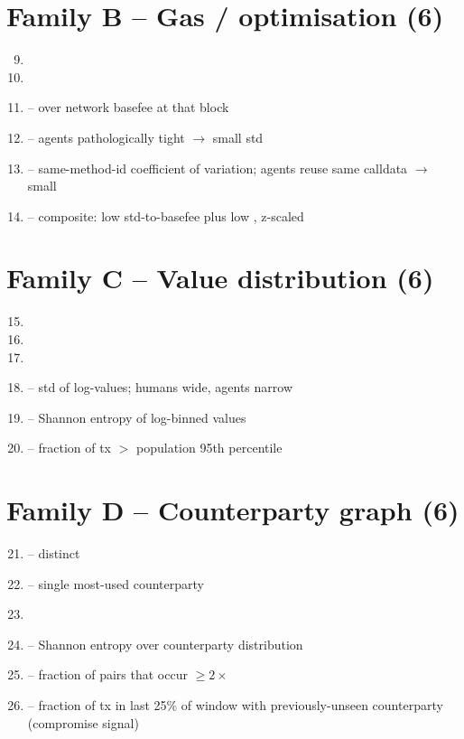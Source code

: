 \documentclass[11pt]{article}
\begin{document}
\section{Family B -- Gas / optimisation (6)}
\begin{enumerate}\setcounter{enumi}{8}
  \item {}
  \item {}
  \item {} -- over network basefee at that block
  \item {} -- agents pathologically tight $\to$
    small std
  \item {} -- same-method-id coefficient of variation;
    agents reuse same calldata $\to$ small
  \item {} -- composite: low std-to-basefee plus
    low , z-scaled
\end{enumerate}

\section{Family C -- Value distribution (6)}
\begin{enumerate}\setcounter{enumi}{14}
  \item {}
  \item {}
  \item {}
  \item {} -- std of log-values; humans wide, agents narrow
  \item {} -- Shannon entropy of log-binned values
  \item {} -- fraction of tx $>$ population 95th
    percentile
\end{enumerate}

\section{Family D -- Counterparty graph (6)}
\begin{enumerate}\setcounter{enumi}{20}
  \item {} -- distinct 
  \item {} -- single most-used counterparty
  \item {}
  \item {} -- Shannon entropy over counterparty
    distribution
  \item {} -- fraction of 
    pairs that occur $\geq 2\times$
  \item {} -- fraction of tx in last 25\% of
    window with previously-unseen counterparty (compromise signal)
\end{enumerate}
\end{document}
